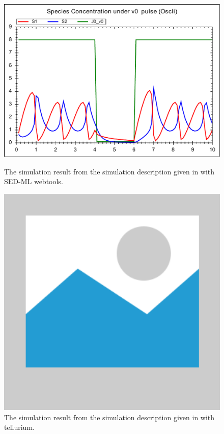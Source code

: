 \begin{figure}[ht]
    \centering
    \begin{minipage}{0.47\textwidth}
        \centering
        \includegraphics[width=1.0\textwidth]{examples/oscli-nested-pulse/results/oscli-nested-pulse}
        \caption{The simulation result from the simulation description given in  with SED-ML webtools.}
    \end{minipage}\hfill
    \begin{minipage}{0.47\textwidth}
        \centering
        \includegraphics[width=1.0\textwidth]{examples/placeholder}
        \caption{The simulation result from the simulation description given in  with tellurium.}
    \end{minipage}
    \label{fig:oscli-nested-pulse}
\end{figure}

